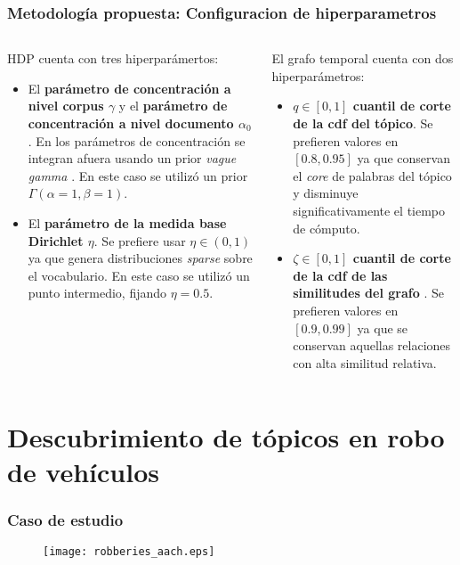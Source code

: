 \documentclass[
	spanish, %
	aspectratio=43, %
	hyperref={pdfencoding=auto,psdextra},
	xcolor={dvipsnames,table,usenames},
]{beamer}
\begin{document}
\begin{frame}[t]
\frametitle{Metodología propuesta: Configuracion de hiperparametros}

\begin{columns}[t]
\begin{column}{0.5\textwidth}
HDP cuenta con tres hiperparámertos:
\begin{itemize} 
  \item El \textbf{parámetro de concentración a nivel corpus $\gamma$} y el \textbf{parámetro de concentración a nivel documento $\alpha_{0}$}. En \cite{teh2005sharing} los parámetros de concentración se integran afuera usando un prior \textit{vague gamma} \cite{escobar1995bayesian}. En este caso se utilizó un prior $\Gamma(\alpha=1, \beta=1)$.
  \item El \textbf{parámetro de la medida base Dirichlet $\eta$}. Se prefiere usar $\eta\in (0,1)$ ya que genera distribuciones \textit{sparse} sobre el vocabulario. En este caso se utilizó un punto intermedio, fijando $\eta=0.5$.
\end{itemize}
\end{column}

\begin{column}{0.5\textwidth}
El grafo temporal cuenta con dos hiperparámetros:
\begin{itemize}
  \item \textbf{$q \in [0,1]$ cuantil de corte de la cdf del tópico}. Se prefieren valores en $[0.8, 0.95]$ ya que conservan el \textit{core} de palabras del tópico y disminuye significativamente el tiempo de cómputo.
  \item \textbf{$\zeta\in[0,1]$ cuantil de corte de la cdf de las similitudes del grafo }. Se prefieren valores en $[0.9, 0.99]$ ya que se conservan aquellas relaciones con alta similitud relativa.
\end{itemize}
\end{column}
\end{columns}
\end{frame}

\section{Descubrimiento de tópicos en robo de vehículos}

\begin{frame}[t]
\frametitle{Caso de estudio}
\begin{figure}
\texttt{[image: robberies\_aach.eps]}
\end{figure}
\end{frame}
\end{document}
